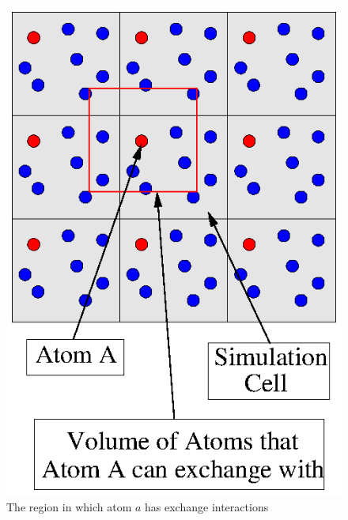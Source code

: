 \documentclass[prb,aps,nobibnotes,twocolumn,doublespace,twocolumngrid,superbib]{revtex4}
\begin{document}
\begin{figure}
\caption{The region in which atom $a$ has exchange interactions}
\label{figure:ExchangeRegion}
{\centering \includegraphics{ExchangeRegion.ps} \par}
\end{figure}
%
%
%
\end{document}
